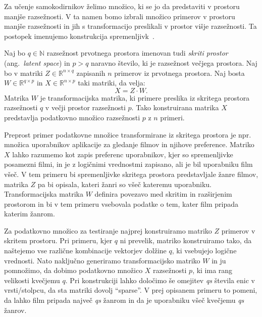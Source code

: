 \documentclass[12pt,a4paper,twoside]{article}
\theoremstyle{definition} %
\theoremstyle{plain} %
\numberwithin{equation}{section}  %
\newcommand{\R}{\mathbb R}
\newcommand{\N}{\mathbb N}
\begin{document}
Za učenje samokodirnikov želimo množico, ki se jo da predstaviti v prostoru manjše razsežnosti.
V ta namen bomo izbrali množico primerov v prostoru manjše razsežnosti in jih s transformacijo preslikali v prostor višje razsežnosti.
Ta postopek imenujemo konstrukcija spremenljivk~\cite[razdelek\ 10.3]{flach2012machine}.

Naj bo $q \in \N$ razsežnost prvotnega prostora imenovan tudi \emph{skriti prostor} (ang.~\textsl{latent space})
in $p > q$ naravno število, ki je razsežnost večjega prostora.
Naj bo v matriki $Z \in \R^{n \times q}$ zapisanih $n$ primerov iz prvotnega prostora.
Naj bosta $W \in \R^{q \times p}$ in $X \in \R^{n \times p}$ taki matriki, da velja:
\[
	X = Z \cdot W.
\]
Matrika $W$ je transformacijska matrika, ki primere preslika iz skritega prostora razsežnosti $q$ v večji prostor razsežnosti $p$.
Tako konstruirana matrika $X$ predstavlja podatkovno množico razsežnosti $p$ z $n$ primeri.

Preprost primer podatkovne množice transformirane iz skritega prostora je npr. množica uporabnikov aplikacije za gledanje filmov in njihove preference.
Matriko $X$ lahko razumemo kot zapis preferenc uporabnikov, kjer so spremenljivke posamezni filmi, in je z logičnimi vrednostmi zapisano, ali je bil uporabniku film všeč.
V tem primeru bi spremenljivke skritega prostora predstavljale žanre filmov, matrika $Z$ pa bi opisala, kateri žanri so všeč kateremu uporabniku.
Transformacijska matrika $W$ definira povezavo med skritim in razširjenim prostorom in bi v tem primeru vsebovala podatke o tem, kater film pripada katerim žanrom.

Za podatkovno množico za testiranje najprej konstruiramo matriko $Z$ primerov v skritem prostoru.
Pri primeru, kjer $q$ ni prevelik, matriko konstruiramo tako, da naštejemo vse različne kombinacije vektorjev dolžine $q$, ki vsebujejo logične vrednosti.
Nato naključno generiramo transformacijsko matriko $W$ in ju pomnožimo, da dobimo podatkovno množico $X$ razsežnosti $p$, ki ima rang velikosti kvečjemu $q$. %
Pri konstrukciji lahko določimo še omejitev \textit{qs} števila enic v vrsti/stolpcu, da sta matriki dovolj ``sparse''. %
V prej opisanem primeru to pomeni, da lahko film pripada največ \textit{qs} žanrom in da je uporabniku všeč kvečjemu \textit{qs} žanrov.
\end{document}
